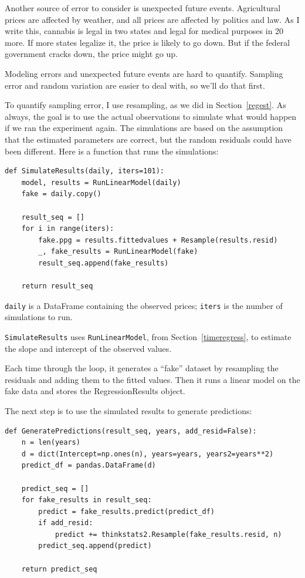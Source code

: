 \documentclass[12pt]{book}
\begin{document}
Another source of error to consider is unexpected future events.
Agricultural prices are affected by weather, and all prices are
affected by politics and law.  As I write this, cannabis is legal in
two states and legal for medical purposes in 20 more.  If more states
legalize it, the price is likely to go down.  But if
the federal government cracks down, the price might go up.

Modeling errors and unexpected future events are hard to quantify.
Sampling error and random variation are easier to deal with, so we'll
do that first.

To quantify sampling error, I use resampling, as we did in
Section~\ref{regest}.  As always, the goal is to use the actual
observations to simulate what would happen if we ran the experiment
again.  The simulations are based on the assumption that the estimated
parameters are correct, but the random residuals could have been
different.  Here is a function that runs the simulations:

\begin{verbatim}
def SimulateResults(daily, iters=101):
    model, results = RunLinearModel(daily)
    fake = daily.copy()
    
    result_seq = []
    for i in range(iters):
        fake.ppg = results.fittedvalues + Resample(results.resid)
        _, fake_results = RunLinearModel(fake)
        result_seq.append(fake_results)

    return result_seq
\end{verbatim}

\verb"daily" is a DataFrame containing the observed prices;
\verb"iters" is the number of simulations to run.

\verb"SimulateResults" uses \verb"RunLinearModel", from
Section~\ref{timeregress}, to estimate the slope and intercept
of the observed values.

Each time through the loop, it generates a ``fake'' dataset by
resampling the residuals and adding them to the fitted values.  Then
it runs a linear model on the fake data and stores the RegressionResults
object.

The next step is to use the simulated results to generate predictions:

\begin{verbatim}
def GeneratePredictions(result_seq, years, add_resid=False):
    n = len(years)
    d = dict(Intercept=np.ones(n), years=years, years2=years**2)
    predict_df = pandas.DataFrame(d)
    
    predict_seq = []
    for fake_results in result_seq:
        predict = fake_results.predict(predict_df)
        if add_resid:
            predict += thinkstats2.Resample(fake_results.resid, n)
        predict_seq.append(predict)

    return predict_seq
\end{verbatim}
\end{document}
